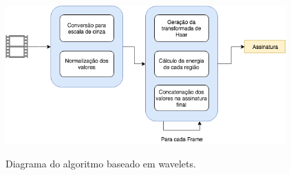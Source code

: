 




 \begin{figure}[h]
      \centering
      \caption{Diagrama do algoritmo baseado em wavelets.}
      \includegraphics[width=0.96\textwidth]{dados/figuras/diagramas/Diag-Wavelets}
       	\label{fig:dia_wavelet}
    \end{figure}  
    
